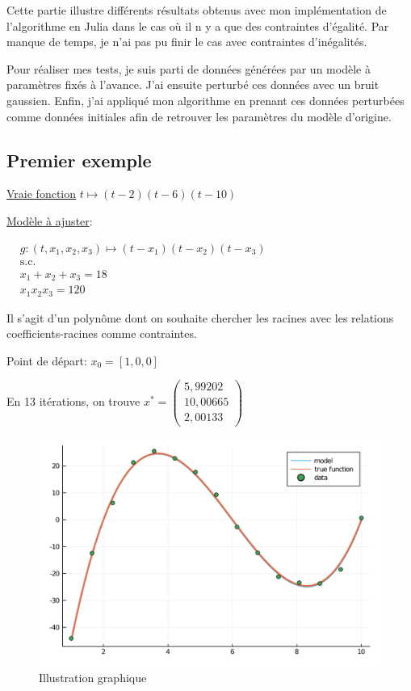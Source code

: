 \documentclass[a4paper,11pt]{article}
\numberwithin{equation}{section}
\begin{document}
Cette partie illustre différents résultats obtenus avec mon implémentation de l'algorithme en Julia dans le cas où il n y a que des contraintes d'égalité. Par manque de temps, je n'ai pas pu finir le cas avec contraintes d'inégalités. 

Pour réaliser mes tests, je suis parti de données générées par un modèle à paramètres fixés à l'avance. J'ai ensuite perturbé ces données avec un bruit gaussien. Enfin, j'ai appliqué mon algorithme en prenant ces données perturbées comme données initiales afin de retrouver les paramètres du modèle d'origine. 

\subsection{Premier exemple}

\underline{Vraie fonction} $t\mapsto (t-2)(t-6)(t-10)$
\newline

\underline{Modèle à ajuster}:

$
\begin{aligned}
&g:(t, x_1, x_2, x_3) \mapsto (t-x_1)(t-x_2)(t-x_3)\\
&\text{s.c.}\\
&x_1+x_2+x_3 = 18 \\
&x_1  x_2  x_3 = 120
\end{aligned}
$

Il s'agit d'un polynôme dont on souhaite chercher les racines avec les relations coefficients-racines comme contraintes.

Point de départ:
$x_{0} = [1, 0, 0]$

En 13 itérations, on trouve 
 $x^{*} = \begin{pmatrix}
5,99202\\
10,00665\\
2,00133
\end{pmatrix}$

\newpage

\begin{figure}[!h]
\centering
\includegraphics[scale=0.6]{images/courbe1}
\caption{Illustration graphique}
\end{figure}
\end{document}
